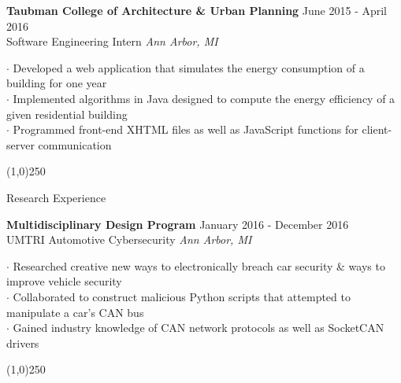 \documentclass{article}
\begin{document}
\vspace*{-0.3cm}

\Large{\textbf{Taubman College of Architecture \& Urban Planning}}
\hfill
\large{June 2015 - April 2016}
\\
\large{Software Engineering Intern}
\hfill
\large{\emph{Ann Arbor, MI}}

\begin{adjustwidth}{1cm}{}
	\begin{spacing}{1}
		$\cdot$ Developed a web application that simulates the energy consumption of a building for one year\\ 
		$\cdot$ Implemented algorithms in Java designed to compute the energy efficiency of a given residential building\\ 
		$\cdot$ Programmed front-end XHTML files as well as JavaScript functions for client-server communication
	\end{spacing}
\end{adjustwidth}

\vspace*{-0.75cm}

\begin{center}
	\line(1,0){250}
\end{center}

{\fontsize{0.75cm}{0.5cm}\selectfont Research Experience}

\Large{\textbf{Multidisciplinary Design Program}}
\hfill
\large{January 2016 - December 2016}
\\
\large{UMTRI Automotive Cybersecurity}
\hfill
\large{\emph{Ann Arbor, MI}}

\begin{adjustwidth}{1cm}{}
	\begin{spacing}{1}
		$\cdot$ Researched creative new ways to electronically breach car security \& ways to improve vehicle security\\ 
		$\cdot$ Collaborated to construct malicious Python scripts that attempted to manipulate a car's CAN bus \\ 
		$\cdot$ Gained industry knowledge of CAN network protocols as well as SocketCAN drivers
	\end{spacing}
\end{adjustwidth}

\vspace*{-0.75cm}

\begin{center}
	\line(1,0){250}
\end{center}
\end{document}
